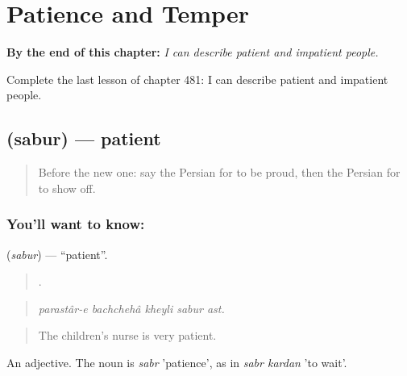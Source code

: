 
\chapter{Patience and Temper}
\label{ch:fa-patience-and-temper}

\begin{chapteropening}
\textbf{By the end of this chapter:} \emph{I can describe patient and impatient people.}

Complete the last lesson of chapter 481: I can describe patient and impatient people.
\end{chapteropening}

\section[\texorpdfstring{\fa{صبور} (sabur)}{صبور (sabur)}]{ (sabur) — patient}

\label{lesson:FA-C481-sabur}



\begin{quote}
Before the new one: say the Persian for to be proud, then the Persian for to show off.
\end{quote}

\subsection*{You'll want to know: }
\textbf{} (\emph{sabur}) — \textquotedblleft{}patient\textquotedblright{}.

\begin{quote}
     .
\end{quote}

\begin{quote}
\emph{parastâr-e bachchehâ kheyli sabur ast.}
\end{quote}

\begin{quote}
The children's nurse is very patient.
\end{quote}

An adjective. The noun is \emph{sabr} 'patience', as in \emph{sabr kardan} 'to wait'.

